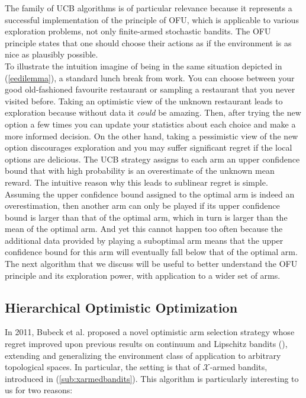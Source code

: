 The family of \gls{UCB} algorithms is of particular relevance because it represents a successful implementation of the principle of \gls{OFU}, which is applicable to various exploration problems, not only finite-armed
stochastic bandits. The \gls{OFU} principle states that one should choose their actions as if the environment is as nice as plausibly possible. \\
To illustrate the intuition imagine of being in the same situation depicted in (\ref{eedilemma}), \ie a standard lunch break from work. You can choose between your good old-fashioned favourite restaurant or sampling a restaurant that you never visited before. Taking an optimistic view of the unknown restaurant leads to exploration because without data it \emph{could} be amazing. Then, after trying the new option a few times you can update your statistics about each choice and make a more
informed decision. On the other hand, taking a pessimistic view of the new option discourages exploration and you may suffer significant regret if the local options are delicious. The \gls{UCB} strategy assigns to each arm an upper confidence bound  that with high probability is an overestimate of the unknown mean reward. The intuitive reason why
this leads to sublinear regret is simple. Assuming the upper confidence bound assigned to the optimal arm is indeed an overestimation, then another arm can only be played if its upper confidence bound is larger than that of the optimal arm, which in turn is larger than the mean of the optimal arm. And yet this cannot happen too often because the additional data provided by playing a suboptimal arm means that the upper confidence bound for this arm will eventually fall below that of the optimal arm.\\
The next algorithm that we discuss will be useful to better understand the \gls{OFU} principle and its exploration power, with application to a wider set of arms.

\subsection{ Hierarchical Optimistic Optimization} \label{sub:hoo}
In 2011, Bubeck et al. \cite{bubeck2011x} proposed a novel optimistic arm selection strategy whose regret improved upon previous results on continuum and Lipschitz bandits (\eg \cite{kleinberg2005nearly, kleinberg2008multi}), extending and generalizing the environment class of application to arbitrary topological spaces. In particular, the setting is that of $\mathcal{X}$-armed bandits, introduced in (\ref{sub:xarmedbandits}). This algorithm is particularly interesting to us for two reasons:

